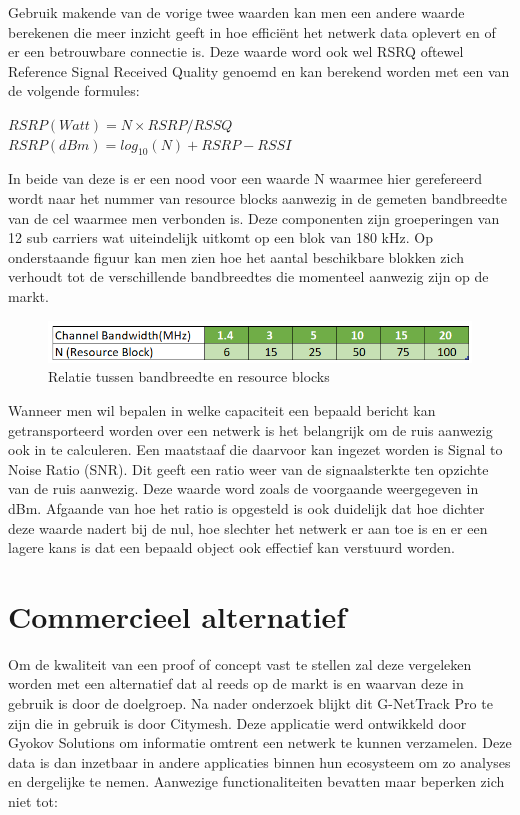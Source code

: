 Gebruik makende van de vorige twee waarden kan men een andere waarde berekenen die meer inzicht geeft in hoe efficiënt het netwerk data oplevert en of er een betrouwbare connectie is. \autocite{Apostu2024} Deze waarde word ook wel RSRQ oftewel Reference Signal Received Quality genoemd en kan berekend worden met een van de volgende formules:

$ RSRP (Watt) = N \times RSRP / RSSQ $ \\
$ RSRP (dBm) = log_{10} (N) + RSRP - RSSI $

In beide van deze is er een nood voor een waarde N waarmee hier gerefereerd wordt naar het nummer van resource blocks aanwezig in de gemeten bandbreedte van de cel waarmee men verbonden is. \autocite{Kovadloff2021} Deze componenten zijn groeperingen van 12 sub carriers wat uiteindelijk uitkomt op een blok van 180 kHz. \autocite{Mishra2018} Op onderstaande figuur kan men zien hoe het aantal beschikbare blokken zich verhoudt tot de verschillende bandbreedtes die momenteel aanwezig zijn op de markt. 

\begin{figure}[ht]
    \includegraphics[width=1\linewidth]{graphics/bandwithandRB}
    \caption[Relatie tussen bandbreedte en resource blocks]{Relatie tussen bandbreedte en resource blocks \autocite{Kovadloff2021}}
    \label{fig:bandwithandrb}
\end{figure}

Wanneer men wil bepalen in welke capaciteit een bepaald bericht kan getransporteerd worden over een netwerk is het belangrijk om de ruis aanwezig ook in te calculeren. Een maatstaaf die daarvoor kan ingezet worden is Signal to Noise Ratio (SNR). Dit geeft een ratio weer van de signaalsterkte ten opzichte van de ruis aanwezig. Deze waarde word zoals de voorgaande weergegeven in dBm. Afgaande van hoe het ratio is opgesteld is ook duidelijk dat hoe dichter deze waarde nadert bij de nul, hoe slechter het netwerk er aan toe is en er een lagere kans is dat een bepaald object ook effectief kan verstuurd worden.  \autocite{Sheldon2021}

\section{Commercieel alternatief}

Om de kwaliteit van een proof of concept vast te stellen zal deze vergeleken worden met een alternatief dat al reeds op de markt is en waarvan deze in gebruik is door de doelgroep. Na nader onderzoek blijkt dit G-NetTrack Pro te zijn die in gebruik is door Citymesh. Deze applicatie werd ontwikkeld door Gyokov Solutions om informatie omtrent een netwerk te kunnen verzamelen. Deze data is dan inzetbaar in andere applicaties binnen hun ecosysteem om zo analyses en dergelijke te nemen.\autocite{Solutions2024}  Aanwezige functionaliteiten bevatten maar beperken zich niet tot:

